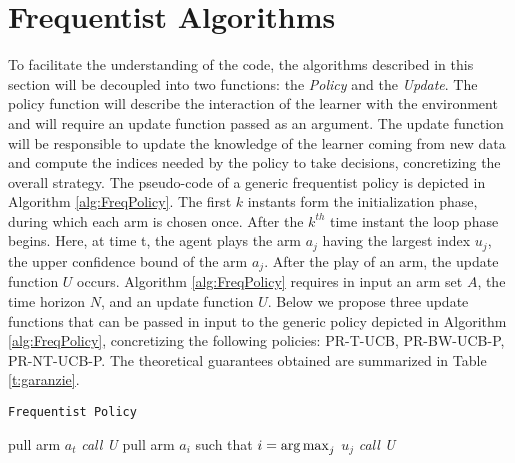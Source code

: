 %	
%	
%	


\section{Frequentist Algorithms}
To facilitate the understanding of the code, the algorithms described in this section will be decoupled into two functions: the \emph{Policy} and the \emph{Update}. The policy function will describe the interaction of the learner with the environment and will require an update function passed as an argument. The update function will be responsible to update the knowledge of the learner coming from new data and compute the indices needed by the policy to take decisions, concretizing the overall strategy. The pseudo-code of a generic frequentist policy is depicted in Algorithm \ref{alg:FreqPolicy}.  The first $k$ instants form the initialization phase, during which  each arm is chosen once. After the $k^{th}$ time instant the loop phase begins. Here, at time t, the agent plays the arm $a_j$ having the largest index $u_j$, the upper confidence bound of the arm $a_j$. After the play of an arm, the update function $U$ occurs.
Algorithm \ref{alg:FreqPolicy} requires in input an arm set $A$, the time horizon $N$, and an update function $U$. Below we propose three update functions that can be passed in input to the generic policy depicted in Algorithm \ref{alg:FreqPolicy}, concretizing the following policies: PR-T-UCB, PR-BW-UCB-P, PR-NT-UCB-P. The theoretical guarantees obtained are summarized in Table \ref{t:garanzie}.

\begin{algorithm}[H]
	\caption{\texttt{Frequentist Policy}}
	\begin{scriptsize}
		\begin{algorithmic}[1]						
			 
			\State pull arm $a_t$\;
			\State \emph{call U}\;
			\EndFor
			 
			\State pull arm $a_i$ such that  $i = \operatorname*{arg\,max}_j$ $u_j $\;
			\State \emph{call U}\;
			\EndFor
			\EndFunction			
		\end{algorithmic}
	\end{scriptsize}
	\label{alg:FreqPolicy}
\end{algorithm}

